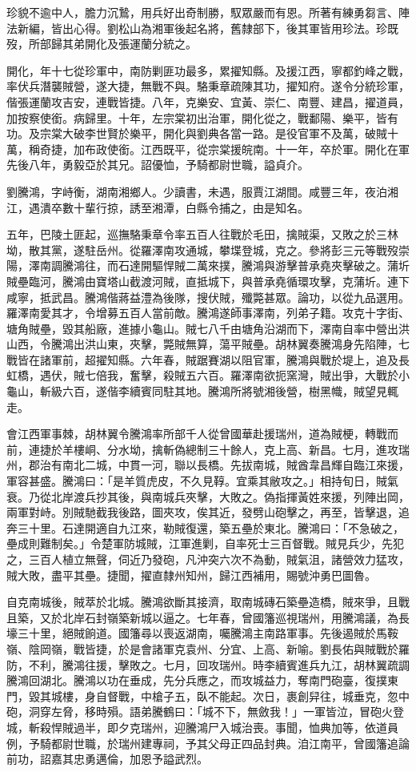 \begin{pinyinscope}
珍貌不逾中人，膽力沉鷙，用兵好出奇制勝，馭眾嚴而有恩。所著有練勇芻言、陣法新編，皆出心得。劉松山為湘軍後起名將，舊隸部下，後其軍皆用珍法。珍既歿，所部歸其弟開化及張運蘭分統之。

開化，年十七從珍軍中，南防剿匪功最多，累擢知縣。及援江西，寧都釣峰之戰，率伏兵潛襲賊營，遂大捷，無戰不與。駱秉章疏陳其功，擢知府。遂令分統珍軍，偕張運蘭攻吉安，連戰皆捷。八年，克樂安、宜黃、崇仁、南豐、建昌，擢道員，加按察使銜。病歸里。十年，左宗棠初出治軍，開化從之，戰鄱陽、樂平，皆有功。及宗棠大破李世賢於樂平，開化與劉典各當一路。是役官軍不及萬，破賊十萬，稱奇捷，加布政使銜。江西既平，從宗棠援皖南。十一年，卒於軍。開化在軍先後八年，勇毅亞於其兄。詔優恤，予騎都尉世職，謚貞介。

劉騰鴻，字峙衡，湖南湘鄉人。少讀書，未遇，服賈江湖間。咸豐三年，夜泊湘江，遇潰卒數十輩行掠，誘至湘潭，白縣令捕之，由是知名。

五年，巴陵土匪起，巡撫駱秉章令率五百人往戰於毛田，擒賊渠，又敗之於三林坳，散其黨，遂駐岳州。從羅澤南攻通城，攀堞登城，克之。參將彭三元等戰歿崇陽，澤南調騰鴻往，而石達開驅悍賊二萬來撲，騰鴻與游擊普承堯夾擊破之。蒲圻賊壘臨河，騰鴻由寶塔山截渡河賊，直抵城下，與普承堯循環攻擊，克蒲圻。連下咸寧，抵武昌。騰鴻偕蔣益澧為後隊，搜伏賊，殲斃甚眾。論功，以從九品選用。羅澤南愛其才，令增募五百人當前敵。騰鴻遂師事澤南，列弟子籍。攻克十字街、塘角賊壘，毀其船廠，進據小龜山。賊七八千由塘角沿湖而下，澤南自率中營出洪山西，令騰鴻出洪山東，夾擊，斃賊無算，蕩平賊壘。胡林翼奏騰鴻身先陷陣，七戰皆在諸軍前，超擢知縣。六年春，賊踞賽湖以阻官軍，騰鴻與戰於堤上，追及長虹橋，遇伏，賊七倍我，奮擊，殺賊五六百。羅澤南欲扼窯灣，賊出爭，大戰於小龜山，斬級六百，遂偕李續賓同駐其地。騰鴻所將號湘後營，樹黑幟，賊望見輒走。

會江西軍事棘，胡林翼令騰鴻率所部千人從曾國華赴援瑞州，道為賊梗，轉戰而前，連捷於羊樓峒、分水坳，擒斬偽總制三十餘人，克上高、新昌。七月，進攻瑞州，郡治有南北二城，中貫一河，聯以長橋。先拔南城，賊酋韋昌輝自臨江來援，軍容甚盛。騰鴻曰：「是羊質虎皮，不久見鞟。宜乘其敝攻之。」相持旬日，賊氣衰。乃從北岸渡兵抄其後，與南城兵夾擊，大敗之。偽指揮黃姓來援，列陣出岡，兩軍對峙。別賊馳截我後路，圖夾攻，俟其近，發劈山砲擊之，再至，皆擊退，追奔三十里。石達開適自九江來，勒賊復還，築五壘於東北。騰鴻曰：「不急破之，壘成則難制矣。」令楚軍防城賊，江軍進剿，自率死士三百督戰。賊見兵少，先犯之，三百人植立無聲，伺近乃發砲，凡沖突六次不為動，賊氣沮，諸營效力猛攻，賊大敗，盡平其壘。捷聞，擢直隸州知州，歸江西補用，賜號沖勇巴圖魯。

自克南城後，賊萃於北城。騰鴻欲斷其接濟，取南城磚石築壘造橋，賊來爭，且戰且築，又於北岸石封嶺築新城以逼之。七年春，曾國籓巡視瑞州，用騰鴻議，為長壕三十里，絕賊餉道。國籓尋以喪返湖南，囑騰鴻主南路軍事。先後遏賊於馬鞍嶺、陰岡嶺，戰皆捷，於是會諸軍克袁州、分宜、上高、新喻。劉長佑與賊戰於羅防，不利，騰鴻往援，擊敗之。七月，回攻瑞州。時李續賓進兵九江，胡林翼疏調騰鴻回湖北。騰鴻以功在垂成，先分兵應之，而攻城益力，奪南門砲臺，復撲東門，毀其城樓，身自督戰，中槍子五，臥不能起。次日，裹創舁往，城垂克，忽中砲，洞穿左脅，移時殞。語弟騰鶴曰：「城不下，無斂我！」一軍皆泣，冒砲火登城，斬殺悍賊過半，即夕克瑞州，迎騰鴻尸入城治喪。事聞，恤典加等，依道員例，予騎都尉世職，於瑞州建專祠，予其父母正四品封典。洎江南平，曾國籓追論前功，詔嘉其忠勇邁倫，加恩予謚武烈。


\end{pinyinscope}
